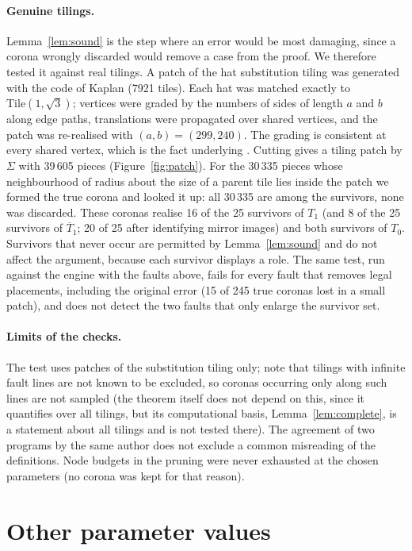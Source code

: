 \documentclass[11pt]{article}
\theoremstyle{remark}
\newcommand{\Tz}{T_0}
\newcommand{\To}{T_1}
\newcommand{\Tob}{\overline{T}_1}
\begin{document}
\paragraph{Genuine tilings.} Lemma~\ref{lem:sound} is the step where an error would be most damaging, since a corona wrongly discarded would remove a case from the proof. We therefore tested it against real tilings. A patch of the hat substitution tiling was generated with the code of Kaplan \cite{hatviz} (7921 tiles). Each hat was matched exactly to $\mathrm{Tile}(1,\sqrt3)$; vertices were graded by the numbers of sides of length $a$ and $b$ along edge paths, translations were propagated over shared vertices, and the patch was re-realised with $(a,b)=(299,240)$. The grading is consistent at every shared vertex, which is the fact underlying \cite[Theorem 6.1]{SMKG24}. Cutting gives a tiling patch by $\Sigma$ with 39\,605 pieces (Figure~\ref{fig:patch}). For the 30\,335 pieces whose neighbourhood of radius about the size of a parent tile lies inside the patch we formed the true corona and looked it up: all 30\,335 are among the survivors, none was discarded. These coronas realise 16 of the 25 survivors of $\To$ (and 8 of the 25 survivors of $\Tob$; 20 of 25 after identifying mirror images) and both survivors of $\Tz$. Survivors that never occur are permitted by Lemma~\ref{lem:sound} and do not affect the argument, because each survivor displays a role. The same test, run against the engine with the faults above, fails for every fault that removes legal placements, including the original error (15 of 245 true coronas lost in a small patch), and does not detect the two faults that only enlarge the survivor set.

\paragraph{Limits of the checks.} The test uses patches of the substitution tiling only; \cite{SMKG24} note that tilings with infinite fault lines are not known to be excluded, so coronas occurring only along such lines are not sampled (the theorem itself does not depend on this, since it quantifies over all tilings, but its computational basis, Lemma~\ref{lem:complete}, is a statement about all tilings and is not tested there). The agreement of two programs by the same author does not exclude a common misreading of the definitions. Node budgets in the pruning were never exhausted at the chosen parameters (no corona was kept for that reason).

\section{Other parameter values}\label{sec:family}
\end{document}
